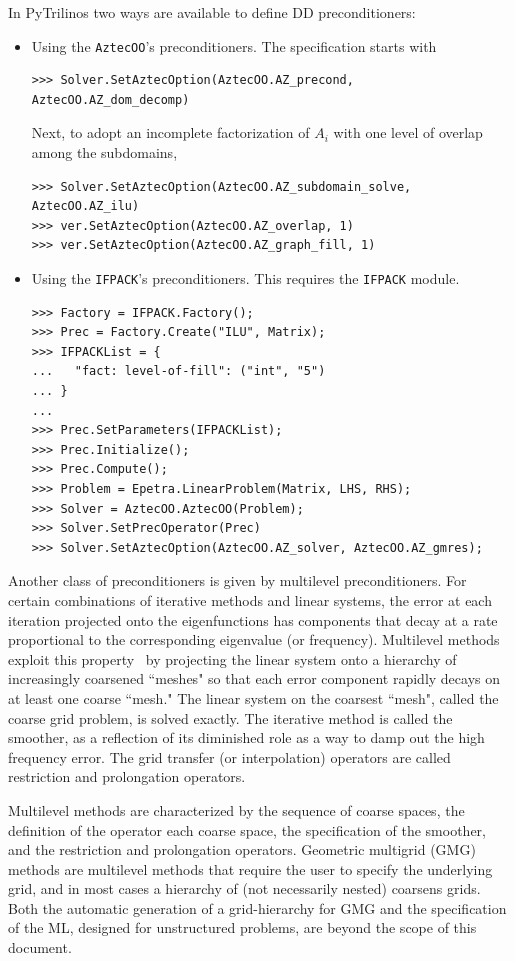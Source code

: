 \documentclass[10pt,relax]{SANDreport}
\begin{document}
In PyTrilinos two ways are available to define DD preconditioners:
\begin{itemize}
\item Using the {\tt AztecOO}'s preconditioners. The specification starts with
\begin{verbatim}
>>> Solver.SetAztecOption(AztecOO.AZ_precond, AztecOO.AZ_dom_decomp)
\end{verbatim}
Next, to adopt an incomplete factorization of $A_i$ with one level of overlap
among the subdomains,
\begin{verbatim}
>>> Solver.SetAztecOption(AztecOO.AZ_subdomain_solve, AztecOO.AZ_ilu)
>>> ver.SetAztecOption(AztecOO.AZ_overlap, 1)
>>> ver.SetAztecOption(AztecOO.AZ_graph_fill, 1)
\end{verbatim}

\item Using the {\tt IFPACK}'s preconditioners. This requires the {\tt IFPACK}
module.
\begin{verbatim}
>>> Factory = IFPACK.Factory();
>>> Prec = Factory.Create("ILU", Matrix);
>>> IFPACKList = {
...   "fact: level-of-fill": ("int", "5")
... }
... 
>>> Prec.SetParameters(IFPACKList);
>>> Prec.Initialize();
>>> Prec.Compute();
>>> Problem = Epetra.LinearProblem(Matrix, LHS, RHS);
>>> Solver = AztecOO.AztecOO(Problem);
>>> Solver.SetPrecOperator(Prec)
>>> Solver.SetAztecOption(AztecOO.AZ_solver, AztecOO.AZ_gmres);
\end{verbatim}
\end{itemize}

\bigskip

Another class of preconditioners is given by multilevel preconditioners.
For certain combinations of iterative methods and linear systems, the
error at each iteration projected onto the eigenfunctions has components
that decay at a rate proportional to the corresponding eigenvalue (or
frequency).  Multilevel methods exploit this property~\cite{Briggs}
by projecting the linear system onto a hierarchy of increasingly
coarsened ``meshes" so that each error component rapidly decays on at
least one coarse ``mesh."  The linear system on the coarsest ``mesh",
called the coarse grid problem, is solved exactly.  The iterative method
is called the smoother, as a reflection of its diminished role as a way
to damp out the high frequency error.  The grid transfer (or
interpolation) operators are called restriction and
prolongation operators.

Multilevel methods are characterized by the sequence of coarse spaces, the
definition of the operator each coarse space, the specification of the
smoother, and the restriction and prolongation operators.  Geometric multigrid
(GMG) methods  are multilevel methods that require the user to specify the
underlying grid, and in most cases a hierarchy of (not necessarily nested)
  coarsens grids.  Both the automatic generation of a grid-hierarchy for GMG
  and the specification of the ML, designed for unstructured problems, are
  beyond the scope of this document.
\end{document}
